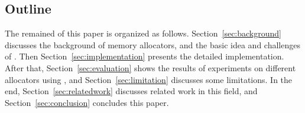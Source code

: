 \subsection*{Outline}

The remained of this paper is organized as follows. Section~\ref{sec:background} discusses the background of memory allocators, and the basic idea and challenges of \MP{}. Then Section~\ref{sec:implementation} presents the detailed implementation. After that, Section~\ref{sec:evaluation} shows the results of experiments on different allocators using \MP{}, and Section~\ref{sec:limitation} discusses some limitations. In the end, Section~\ref{sec:relatedwork} discusses related work in this field, and Section~\ref{sec:conclusion} concludes this paper.